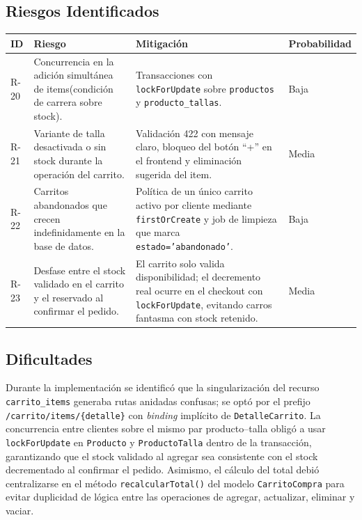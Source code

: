 \documentclass[12pt,a4paper]{article}
\begin{document}
\subsection*{Riesgos Identificados}

\begin{center}
\small
\begin{tabularx}{\textwidth}{p{1.2cm} p{4.6cm} L p{2cm}}
\toprule
\textbf{ID} & \textbf{Riesgo} & \textbf{Mitigación} & \textbf{Probabilidad} \\
\midrule
R-20 & Concurrencia en la adición simultánea de items(condición de carrera sobre stock). & Transacciones con \texttt{lockForUpdate} sobre \texttt{productos} y \texttt{producto\_tallas}. & Baja \\
R-21 & Variante de talla desactivada o sin stock durante la operación del carrito. & Validación 422 con mensaje claro, bloqueo del botón ``+'' en el frontend y eliminación sugerida del item. & Media \\
R-22 & Carritos abandonados que crecen indefinidamente en la base de datos. & Política de un único carrito activo por cliente mediante \texttt{firstOrCreate} y job de limpieza que marca \texttt{estado='abandonado'}. & Baja \\
R-23 & Desfase entre el stock validado en el carrito y el reservado al confirmar el pedido. & El carrito solo valida disponibilidad; el decremento real ocurre en el checkout con \texttt{lockForUpdate}, evitando carros fantasma con stock retenido. & Media \\
\bottomrule
\end{tabularx}
\end{center}

\subsection*{Dificultades}

Durante la implementación se identificó que la singularización del recurso \texttt{carrito\_items} generaba rutas anidadas confusas; se optó por el prefijo \texttt{/carrito/items/\{detalle\}} con \textit{binding} implícito de \texttt{DetalleCarrito}. La concurrencia entre clientes sobre el mismo par producto--talla obligó a usar \texttt{lockForUpdate} en \texttt{Producto} y \texttt{ProductoTalla} dentro de la transacción, garantizando que el stock validado al agregar sea consistente con el stock decrementado al confirmar el pedido. Asimismo, el cálculo del total debió centralizarse en el método \texttt{recalcularTotal()} del modelo \texttt{CarritoCompra} para evitar duplicidad de lógica entre las operaciones de agregar, actualizar, eliminar y vaciar.
\end{document}
